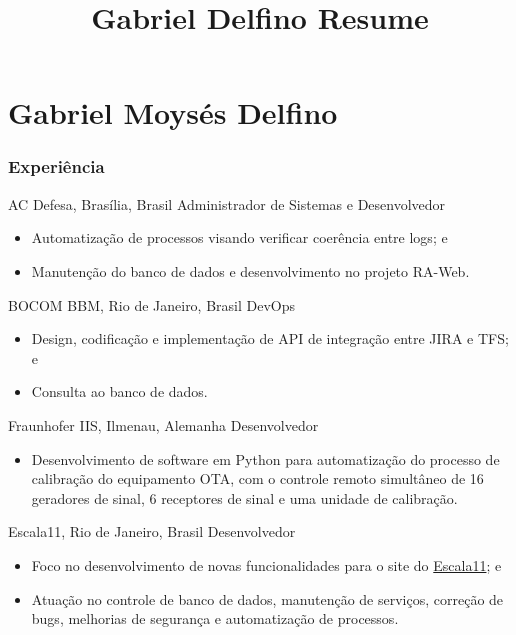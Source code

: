 \documentclass{tccv}
\title{Gabriel Delfino Resume}
\begin{document}
\part{Gabriel Moysés Delfino}


\section{Experiência}

    \begin{eventlist}
    	
    	{AC Defesa, Brasília, Brasil}
    	{Administrador de Sistemas e Desenvolvedor}
    	\begin{itemize}
    		\item Automatização de processos visando verificar coerência entre logs; e
    		\item Manutenção do banco de dados e desenvolvimento no projeto RA-Web.
    	\end{itemize}

            {BOCOM BBM, Rio de Janeiro, Brasil}
            {DevOps}
            \begin{itemize}
                \item Design, codificação e implementação de API de integração entre JIRA e TFS; e
                \item Consulta ao banco de dados.
            \end{itemize}
 
            {Fraunhofer IIS, Ilmenau, Alemanha}
            {Desenvolvedor}
            \begin{itemize}
                \item Desenvolvimento de software em Python para automatização do processo de calibração do equipamento OTA, com o controle remoto simultâneo de 16 geradores de sinal, 6 receptores de sinal e uma unidade de calibração.
            \end{itemize}
        
            {Escala11, Rio de Janeiro, Brasil}
            {Desenvolvedor}
            \begin{itemize}
                \item Foco no desenvolvimento de novas funcionalidades para o site do \href{https://www.escala11.com/}{Escala11}; e
                \item Atuação no controle de banco de dados, manutenção de serviços, correção de bugs, melhorias de segurança e automatização de processos.
            \end{itemize}
    \end{eventlist}
\end{document}

